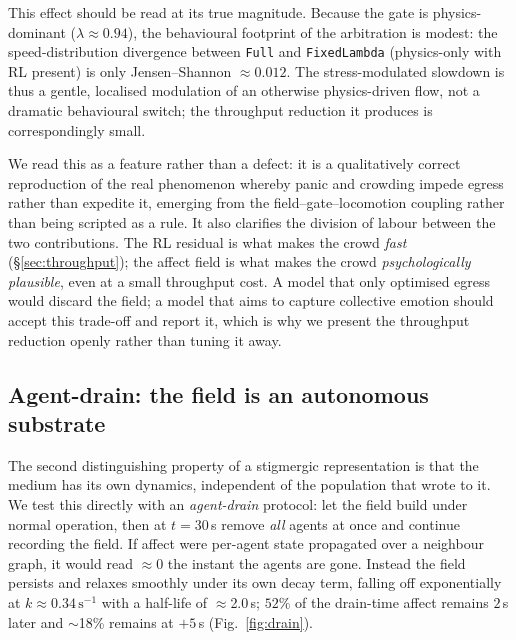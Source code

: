 \documentclass[sigconf,nonacm]{acmart}
\begin{document}
This effect should be read at its true magnitude. Because the gate is physics-dominant
($\lambda\approx0.94$), the behavioural footprint of the arbitration is modest: the speed-distribution
divergence between \texttt{Full} and \texttt{FixedLambda} (physics-only with RL present) is only
Jensen--Shannon $\approx0.012$. The stress-modulated slowdown is thus a gentle, localised modulation
of an otherwise physics-driven flow, not a dramatic behavioural switch; the throughput reduction it
produces is correspondingly small.

We read this as a feature rather than a defect: it is a qualitatively correct reproduction of the
real phenomenon whereby panic and crowding impede egress rather than expedite it, emerging from the
field--gate--locomotion coupling rather than being scripted as a rule. It also clarifies the division
of labour between the two contributions. The RL residual is what makes the crowd \emph{fast}
(\S\ref{sec:throughput}); the affect field is what makes the crowd \emph{psychologically plausible},
even at a small throughput cost. A model that only optimised egress would discard the field; a model
that aims to capture collective emotion should accept this trade-off and report it, which is why we
present the throughput reduction openly rather than tuning it away.

\subsection{Agent-drain: the field is an autonomous substrate}
\label{sec:drain}
The second distinguishing property of a stigmergic representation is that the medium has its own
dynamics, independent of the population that wrote to it. We test this directly with an
\emph{agent-drain} protocol: let the field build under normal operation, then at $t=30$\,s remove
\emph{all} agents at once and continue recording the field. If affect were per-agent state propagated
over a neighbour graph, it would read $\approx0$ the instant the agents are gone. Instead the field
persists and relaxes smoothly under its own decay term, falling off exponentially at
$k\approx0.34\,\mathrm{s}^{-1}$ with a half-life of $\approx$2.0\,s; $52\%$ of the drain-time affect
remains $2$\,s later and $\sim$18\% remains at $+5$\,s (Fig.~\ref{fig:drain}).
\end{document}
